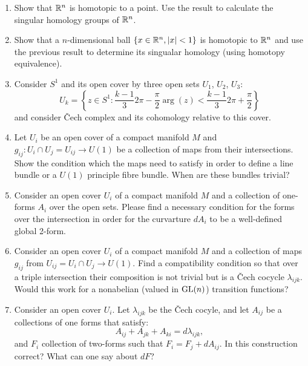 \documentclass[a4paper,11pt]{article}
\begin{document}
\begin{enumerate}
\item Show that $\mathbb{R}^{ n }$ is homotopic to a point. Use the result
  to calculate the singular homology groups of $\mathbb{R}^{ n }$.

\item Show that a $n$-dimensional ball
  $\{ x \in \mathbb{R}^{ n }, \lvert{  x  }\rvert < 1 \}$ is homotopic to $\mathbb{R}^{ n }$
  and use the previous result to determine its singualar homology
  (using homotopy equivalence).

\item Consider $S^{ 1 }$ and its open cover by three open sets
  $U_{ 1 }$, $U_{ 2 }$, $U_{ 3 }$:
  \begin{equation}
    \label{DiffGeo:06}
    U_{ k } =
    \left\{ z \in S^{ 1 } : \frac{ k - 1 }{ 3 } 2\pi - \frac{ \pi }{ 2 }
      \arg( z ) < \frac{ k - 1 }{ 3 } 2\pi + \frac{ \pi }{ 2 } \right\}
  \end{equation}
  and consider \v{C}ech complex and its cohomology relative to this
  cover.

\item Let $U_{ i }$ be an open cover of a compact manifold $M$ and
  $g_{ i j } : U_{ i } \cap U_{ j } = U_{ i j } \to U( 1 )$ be a
  collection of maps from their intersections. Show the condition
  which the maps need to satisfy in order to define a line bundle or a
  $U( 1 )$ principle fibre bundle. When are these bundles trivial?

\item Consider an open cover $U_{ i }$ of a compact manifold $M$ and a
  collection of one-forms $A_{ i }$ over the open sets. Please find a
  necessary condition for the forms over the intersection in order for
  the curvarture $dA_{ i }$ to be a well-defined global 2-form.

\item Consider an open cover $U_{ i }$ of a compact manifold $M$ and a
  collection of maps $g_{ ij }$ from
  $U_{ ij } = U_{ i } \cap U_{ j } \to U( 1 )$. Find a compatibility
  condition so that over a triple intersection their composition is
  not trivial but is a \v{C}ech cocycle $\lambda_{ i j k }$. Would
  this work for a nonabelian (valued in $\mathrm{GL}( n )$) transition
  functions?

\item Consider an open cover $U_{ i }$. Let $\lambda_{ i j k }$ be the
  \v{C}ech cocyle, and let $A_{ i j }$ be a collections of one forms
  that satisfy:
  \begin{equation}
    \label{DiffGeo:07}
    A_{ i j } + A_{ j k } + A_{ k i } = d\lambda_{ i j k },
  \end{equation}
  and $F_{ i }$ collection of two-forms such that
  $F_{ i } = F_{ j } + dA_{ i j }$. In this construction correct? What
  can one say about $dF$?


\end{enumerate}
\end{document}

